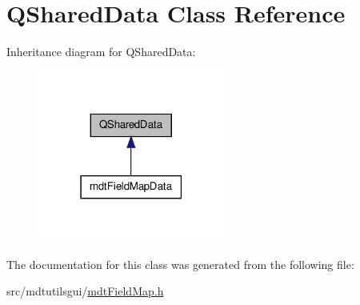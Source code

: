 \hypertarget{class_q_shared_data}{\section{Q\-Shared\-Data Class Reference}
\label{class_q_shared_data}
}


Inheritance diagram for Q\-Shared\-Data\-:
\nopagebreak
\begin{figure}[H]
\begin{center}
\leavevmode
\includegraphics[width=174pt]{class_q_shared_data__inherit__graph}
\end{center}
\end{figure}


The documentation for this class was generated from the following file\-:\begin{DoxyCompactItemize}
\item 
src/mdtutilsgui/\hyperlink{mdt_field_map_8h}{mdt\-Field\-Map.\-h}\end{DoxyCompactItemize}
